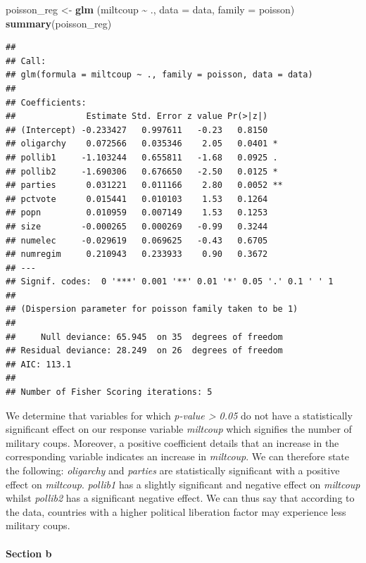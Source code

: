 \documentclass[
  11pt,
]{article}
\newenvironment{Shaded}{\begin{snugshade}}{\end{snugshade}}
\newcommand{\AttributeTok}[1]{\textcolor[rgb]{0.13,0.29,0.53}{#1}}
\newcommand{\FunctionTok}[1]{\textcolor[rgb]{0.13,0.29,0.53}{\textbf{#1}}}
\newcommand{\NormalTok}[1]{#1}
\newcommand{\OtherTok}[1]{\textcolor[rgb]{0.56,0.35,0.01}{#1}}
\newcommand{\SpecialCharTok}[1]{\textcolor[rgb]{0.81,0.36,0.00}{\textbf{#1}}}
\begin{document}
\begin{Shaded}
\begin{Highlighting}[]
\NormalTok{poisson\_reg }\OtherTok{\textless{}{-}} \FunctionTok{glm}\NormalTok{ (miltcoup }\SpecialCharTok{\textasciitilde{}}\NormalTok{ ., }\AttributeTok{data =}\NormalTok{ data, }\AttributeTok{family =}\NormalTok{ poisson)}
\FunctionTok{summary}\NormalTok{(poisson\_reg)}
\end{Highlighting}
\end{Shaded}

\begin{verbatim}
## 
## Call:
## glm(formula = miltcoup ~ ., family = poisson, data = data)
## 
## Coefficients:
##              Estimate Std. Error z value Pr(>|z|)   
## (Intercept) -0.233427   0.997611   -0.23   0.8150   
## oligarchy    0.072566   0.035346    2.05   0.0401 * 
## pollib1     -1.103244   0.655811   -1.68   0.0925 . 
## pollib2     -1.690306   0.676650   -2.50   0.0125 * 
## parties      0.031221   0.011166    2.80   0.0052 **
## pctvote      0.015441   0.010103    1.53   0.1264   
## popn         0.010959   0.007149    1.53   0.1253   
## size        -0.000265   0.000269   -0.99   0.3244   
## numelec     -0.029619   0.069625   -0.43   0.6705   
## numregim     0.210943   0.233933    0.90   0.3672   
## ---
## Signif. codes:  0 '***' 0.001 '**' 0.01 '*' 0.05 '.' 0.1 ' ' 1
## 
## (Dispersion parameter for poisson family taken to be 1)
## 
##     Null deviance: 65.945  on 35  degrees of freedom
## Residual deviance: 28.249  on 26  degrees of freedom
## AIC: 113.1
## 
## Number of Fisher Scoring iterations: 5
\end{verbatim}

We determine that variables for which \emph{p-value \textgreater{} 0.05}
do not have a statistically significant effect on our response variable
\emph{miltcoup} which signifies the number of military coups. Moreover,
a positive coefficient details that an increase in the corresponding
variable indicates an increase in \emph{miltcoup}. We can therefore
state the following: \emph{oligarchy} and \emph{parties} are
statistically significant with a positive effect on \emph{miltcoup}.
\emph{pollib1} has a slightly significant and negative effect on
\emph{miltcoup} whilst \emph{pollib2} has a significant negative effect.
We can thus say that according to the data, countries with a higher
political liberation factor may experience less military coups.

\paragraph{Section b}\label{section-b-1}
\end{document}
